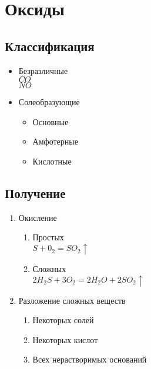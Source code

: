 \section{Оксиды}
\subsection{Классификация}
\begin{itemize}
    \item Безразличные\\
    $CO$\\
    $NO$

    \item Солеобразующие
    \begin{itemize}
        \item Основные   
        \item Амфотерные 
        \item Кислотные  
    \end{itemize}
\end{itemize}



\subsection{Получение}
\begin{enumerate}
    \item Окисление
    \begin{enumerate}
        \item Простых\\
            $S + 0_2 = SO_2\uparrow$
        \item Сложных\\
            $2H_2S + 3O_2 = 2H_2O + 2SO_2\uparrow$
    \end{enumerate}

    \item Разложение сложных веществ
    \begin{enumerate}
        \item Некоторых солей
        \item Некоторых кислот
        \item Всех нерастворимых оснований
    \end{enumerate}
\end{enumerate}



